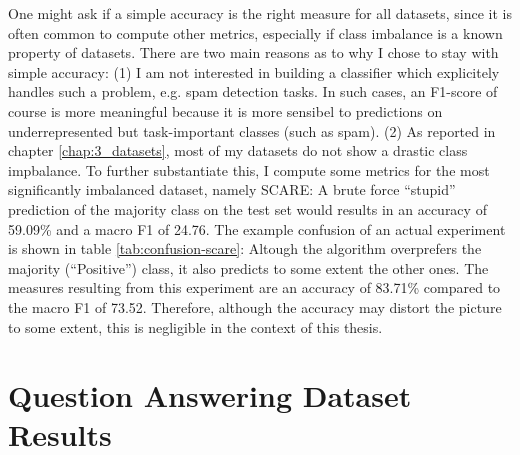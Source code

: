 One might ask if a simple accuracy is the right measure for all datasets, since
it is often common to compute other metrics, especially if class imbalance is
a known property of datasets. There are two main reasons as to why I chose to
stay with simple accuracy: (1) I am not interested in building a classifier
which explicitely handles such a problem, e.g. spam detection tasks. In such
cases, an F1-score of course is more meaningful because it is more sensibel to
predictions on underrepresented but task-important classes (such as spam). (2)
As reported in chapter \ref{chap:3_datasets}, most of my datasets do not show a
drastic class impbalance. To further substantiate this, I compute some metrics
for the most significantly imbalanced dataset, namely SCARE: A brute force
``stupid'' prediction of the majority class on the test set would results in an
accuracy of 59.09\% and a macro F1 of 24.76. The example confusion of an actual
experiment is shown in table \ref{tab:confusion-scare}: Altough the algorithm
overprefers the majority (``Positive'') class, it also predicts to some extent
the other ones. The measures resulting from this experiment are an accuracy of
83.71\% compared to the macro F1 of 73.52. Therefore, although the accuracy may
distort the picture to some extent, this is negligible in the context of this
thesis.




\section{Question Answering Dataset Results}

